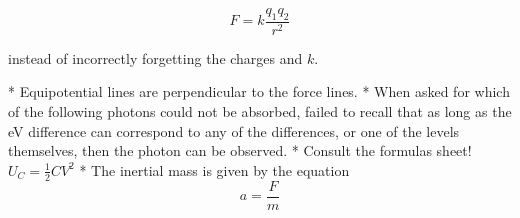 \documentclass{article}
\begin{document}
$$
F = k\frac{q_1 q_2}{r^2}
$$

\begin{markdown}

instead of incorrectly forgetting the charges and $k$.

* Equipotential lines are perpendicular to the force lines.
* When asked for which of the following photons could not be absorbed, failed to recall that as long as the eV difference can correspond to any of the differences, or one of the levels themselves, then the photon can be observed.
* Consult the formulas sheet! $U_C = \frac{1}{2}CV^2$
* The inertial mass is given by the equation $$a = \frac{F}{m}$$

\end{markdown}
\end{document}
